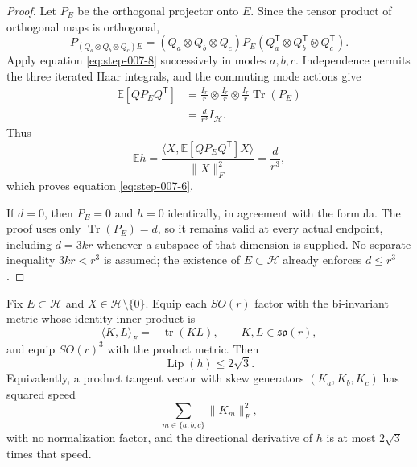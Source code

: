 \begin{proof}
Let \(P_E\) be the orthogonal projector onto \(E\). Since the tensor product
of orthogonal maps is orthogonal,
\begin{equation}
  P_{(Q_a\otimes Q_b\otimes Q_c)E}
  =(Q_a\otimes Q_b\otimes Q_c)P_E
   (Q_a^{\mathsf T}\otimes Q_b^{\mathsf T}\otimes Q_c^{\mathsf T}). \label{eq:step-007-9}
\end{equation}
Apply equation \eqref{eq:step-007-8} successively in modes \(a,b,c\). Independence permits the
three iterated Haar integrals, and the commuting mode actions give
\begin{equation}
\begin{aligned}
  \mathbb E[QP_EQ^{\mathsf T}]
  &=\frac{I_r}{r}\otimes\frac{I_r}{r}\otimes\frac{I_r}{r}
    \operatorname{Tr}(P_E)\\
  &=\frac d{r^3}I_{\mathcal H}.
\end{aligned}\label{eq:step-007-10}
\end{equation}
Thus
\[
  \mathbb Eh
  =\frac{\langle X,\mathbb E[QP_EQ^{\mathsf T}]X\rangle}
         {\|X\|_F^2}
  =\frac d{r^3},
\]
which proves equation \eqref{eq:step-007-6}.

If \(d=0\), then \(P_E=0\) and \(h=0\) identically, in agreement with the
formula. The proof uses only \(\operatorname{Tr}(P_E)=d\), so it remains
valid at every actual endpoint, including \(d=3kr\) whenever a subspace of
that dimension is supplied. No separate inequality \(3kr<r^3\) is assumed;
the existence of \(E\subset\mathcal H\) already enforces \(d\le r^3\).


\end{proof}


\begin{lemma}
\label{lem:step-007-lipschitz}
Fix \(E\subset\mathcal H\) and \(X\in\mathcal H\setminus\{0\}\). Equip each
\(SO(r)\) factor with the bi-invariant metric whose identity inner product is
\[
  \langle K,L\rangle_F=-\operatorname{tr}(KL),
  \qquad K,L\in\mathfrak{so}(r),
\]
and equip \(SO(r)^3\) with the product metric. Then
\begin{equation}
  \boxed{\operatorname{Lip}(h)\le2\sqrt3}.                  \label{eq:step-007-11}
\end{equation}
Equivalently, a product tangent vector with skew generators
\((K_a,K_b,K_c)\) has squared speed
\[
  \sum_{m\in\{a,b,c\}}\|K_m\|_F^2,
\]
with no normalization factor, and the directional derivative of \(h\) is at
most \(2\sqrt3\) times that speed.

\end{lemma}


